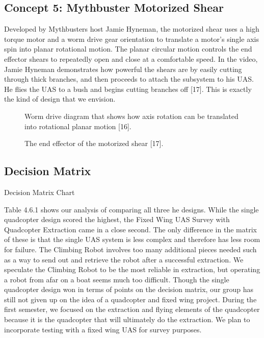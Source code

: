 \documentclass{wrcecapstone}
\begin{document}
\subsection{Concept 5: Mythbuster Motorized Shear}
Developed by Mythbusters host Jamie Hyneman, the motorized shear uses a high torque motor and a worm drive gear orientation to translate a motor’s single axis spin into planar rotational motion. The planar circular motion controls the end effector shears to repeatedly open and close at a comfortable speed. In the video, Jamie Hyneman demonstrates how powerful the shears are by easily cutting through thick branches, and then proceeds to attach the subsystem to his UAS. He flies the UAS to a bush and begins cutting branches off [17]. This is exactly the kind of design that we envision.
\begin{figure}
\caption{Worm drive diagram that shows how axis rotation can be translated into rotational planar motion [16].}
\end{figure}
\begin{figure}
\caption{The end effector of the motorized shear [17].}
\end{figure}







\subsection{Decision Matrix}
\begin{table}
\caption{Decision Matrix Chart}
\end{table}

Table 4.6.1 shows our analysis of comparing all three he designs. While the single quadcopter design scored the highest, the Fixed Wing UAS Survey with Quadcopter Extraction came in a close second. The only difference in the matrix of these is that the single UAS system is less complex and therefore has less room for failure. The Climbing Robot involves too many additional pieces needed such as a way to send out and retrieve the robot after a successful extraction. We speculate the Climbing Robot to be the most reliable in extraction, but operating a robot from afar on a boat seems much too difficult. Though the single quadcopter design won in terms of points on the decision matrix, our group has still not given up on the idea of a quadcopter and fixed wing project. During the first semester, we focused on the extraction and flying elements of the quadcopter because it is the quadcopter that will ultimately do the extraction. We plan to incorporate testing with a fixed wing UAS for survey purposes.
\end{document}
